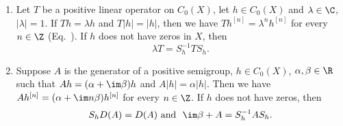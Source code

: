 \begin{theorem}\label{thm:b3-2.4}
\begin{enumerate}[\upshape (i)]	
\item
Let $T$ be a positive linear operator on $C_{0}(X)$, let $h \in C_{0}(X)$ and $\lambda \in \C$, $|\lambda| = 1$.
	If\/ $Th = \lambda h$ and $T|h| = |h|$, then we have $Th^{[n]} = \lambda^{n}h^{[n]}$ for every $n \in \Z$ (\cf Eq.~).
	If\/ $h$ does not have zeros in $X$, then 
	\[
	\lambda T = S_{h}^{-1}TS_{h}.
	\]
\item
Suppose $A$ is the generator of a positive semigroup, $h \in C_{0}(X)$, $\alpha,\beta \in \R$ such that $Ah = (\alpha+\im\beta )h$ and $A|h| = \alpha|h|$. 
	Then we have $Ah^{[n]} = (\alpha+\im n\beta)h^{[n]}$ for every $n \in \Z$.
	If\/ $h$ does not have zeros, then 
	\[
	S_{h}D(A) = D(A) \text{ and \ } \im\beta + A = S_{h}^{-1}AS_{h}.
	\]
\end{enumerate}
\end{theorem}
